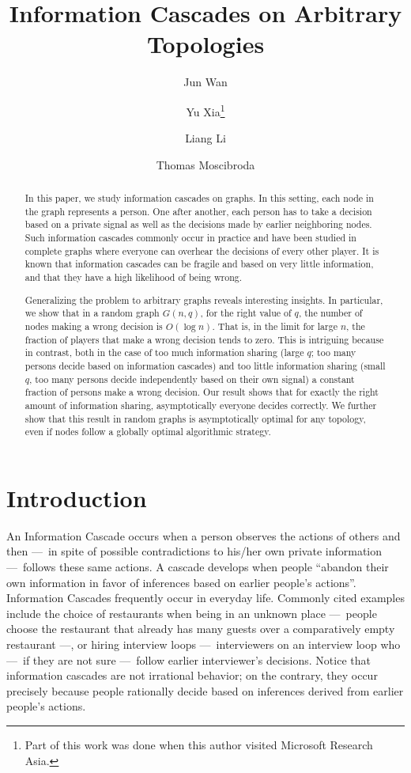 \documentclass[a4paper,UKenglish]{lipics}
\title{Information Cascades on Arbitrary Topologies}
\author[1]{Jun Wan}
\author[2]{Yu Xia\footnote{Part of this work was done when this author visited Microsoft Research Asia.}}
\author[3]{Liang Li}
\author[4]{Thomas Moscibroda}
\affil[1]{Tsinghua University, IIIS\\
  \texttt{wanj12@mails.tsinghua.edu.cn}}
\affil[2]{Tsinghua University, IIIS\\
  \texttt{xiay12@mails.tsinghua.edu.cn}}
\affil[3]{Microsoft Research\\
  \texttt{liangl@microsoft.com}}
\affil[4]{Microsoft Research\\
  \texttt{moscitho@microsoft.com}}
\theoremstyle{definition}
\begin{document}
\maketitle

\begin{abstract}
In this paper, we study information cascades on graphs. 
In this setting, each node in the graph represents a person. 
One after another, each person has to take a decision based on a private signal as well as the decisions made by earlier neighboring nodes. 
Such information cascades commonly occur in practice and have been studied in complete graphs where everyone can overhear the decisions of every other player. 
It is known that information cascades can be fragile and based on very little information, and that they have a high likelihood of being wrong. 

Generalizing the problem to arbitrary graphs reveals interesting insights. 
In particular, we show that in a random graph $G(n,q)$, for the right value of $q$, the number of nodes making a wrong decision is $O(\log n)$. 
That is, in the limit for large $n$, the fraction of players that make a wrong decision tends to zero. 
This is intriguing because in contrast, both in the case of too much information sharing (large $q$; too many persons decide based on information cascades) and too little information sharing (small $q$, too many persons decide independently based on their own signal) a constant fraction of persons make a wrong decision. 
Our result shows that for exactly the right amount of information sharing, asymptotically everyone decides correctly. 
We further show that this result in random graphs is asymptotically optimal for any topology, even if nodes follow a globally optimal algorithmic strategy.
\end{abstract}









\section{Introduction}\label{sec:intro}

An Information Cascade occurs when a person observes the actions of others and then
	---~in spite of possible contradictions to his/her own private information
	---~follows these same actions. 
A cascade develops when people 
	``abandon their own information in favor of inferences based on earlier people's actions''\cite{easley2010networks}. 
Information Cascades frequently occur in everyday life. 
Commonly cited examples include the choice of restaurants when being in an unknown place
	---~people choose the restaurant that already has many guests over a comparatively empty restaurant
	---, or hiring interview loops
	---~interviewers on an interview loop who
	---~if they are not sure
	---~follow earlier interviewer's decisions. 
Notice that information cascades are not irrational behavior; 
	on the contrary, 
	they occur precisely because people rationally decide based on inferences derived from earlier people's actions.  
\end{document}
